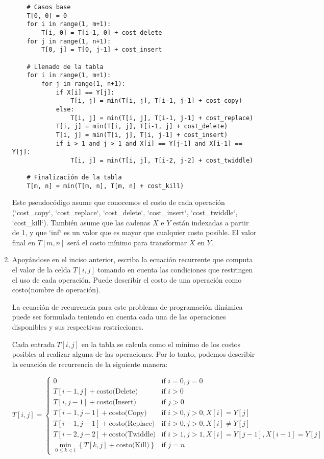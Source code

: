\begin{problema}
\begin{enumerate}
\begin{sol}
\begin{verbatim}
    # Casos base
    T[0, 0] = 0
    for i in range(1, m+1):
        T[i, 0] = T[i-1, 0] + cost_delete
    for j in range(1, n+1):
        T[0, j] = T[0, j-1] + cost_insert
    
    # Llenado de la tabla
    for i in range(1, m+1):
        for j in range(1, n+1):
            if X[i] == Y[j]:
                T[i, j] = min(T[i, j], T[i-1, j-1] + cost_copy)
            else:
                T[i, j] = min(T[i, j], T[i-1, j-1] + cost_replace)
            T[i, j] = min(T[i, j], T[i-1, j] + cost_delete)
            T[i, j] = min(T[i, j], T[i, j-1] + cost_insert)
            if i > 1 and j > 1 and X[i] == Y[j-1] and X[i-1] == Y[j]:
                T[i, j] = min(T[i, j], T[i-2, j-2] + cost_twiddle)
    
    # Finalización de la tabla
    T[m, n] = min(T[m, n], T[m, n] + cost_kill)
\end{verbatim}


Este pseudocódigo asume que conocemos el costo de cada operación (`cost\_copy`, `cost\_replace`, `cost\_delete`, `cost\_insert`, `cost\_twiddle`, `cost\_kill`). También asume que las cadenas $X$ e $Y$ están indexadas a partir de 1, y que `inf` es un valor que es mayor que cualquier costo posible. El valor final en $T[m, n]$ será el costo mínimo para transformar $X$ en $Y$.
    \end{sol}
    \item Apoyándose en el inciso anterior, escriba la ecuación recurrente que computa el valor de la celda $T[i, j]$ tomando en cuenta las condiciones que restringen el uso de cada operación. Puede describir el costo de una operación como costo(nombre de operación).
    \begin{sol}
        La ecuación de recurrencia para este problema de programación dinámica puede ser formulada teniendo en cuenta cada una de las operaciones disponibles y sus respectivas restricciones. 

Cada entrada $T[i, j]$ en la tabla se calcula como el mínimo de los costos posibles al realizar alguna de las operaciones. Por lo tanto, podemos describir la ecuación de recurrencia de la siguiente manera:

\[
T[i, j] = 
\begin{cases} 
0 & \text{if } i=0, j=0 \\
T[i-1, j] + \text{costo(Delete)} & \text{if } i>0 \\
T[i, j-1] + \text{costo(Insert)} & \text{if } j>0 \\
T[i-1, j-1] + \text{costo(Copy)} & \text{if } i>0, j>0, X[i] = Y[j] \\
T[i-1, j-1] + \text{costo(Replace)} & \text{if } i>0, j>0, X[i] \neq Y[j] \\
T[i-2, j-2] + \text{costo(Twiddle)} & \text{if } i>1, j>1, X[i] = Y[j-1], X[i-1] = Y[j] \\
\min_{0 \leq k < i} \left\{T[k, j] + \text{costo(Kill)}\right\} & \text{if } j = n
\end{cases}
\]


\end{sol}
\end{enumerate}
\end{problema}
